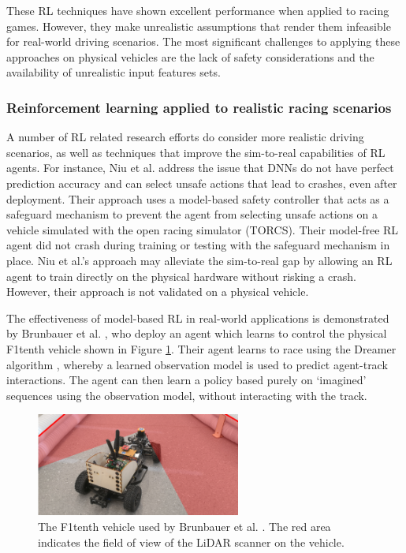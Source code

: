 These RL techniques have shown excellent performance when applied to racing games. 
However, they make unrealistic assumptions that render them infeasible for real-world driving scenarios.
The most significant challenges to applying these approaches on physical vehicles are the lack of safety considerations and the availability of unrealistic input features sets.


\subsubsection*{Reinforcement learning applied to realistic racing scenarios}

A number of RL related research efforts do consider more realistic driving scenarios, as well as techniques that improve the sim-to-real capabilities of RL agents.
For instance, Niu et al. \cite{Niu2020} address the issue that DNNs do not have perfect prediction accuracy and can select unsafe actions that lead to crashes, even after deployment.
Their approach uses a model-based safety controller that acts as a safeguard mechanism to prevent the agent from selecting unsafe actions on a vehicle simulated with the open racing simulator (TORCS).
Their model-free RL agent did not crash during training or testing with the safeguard mechanism in place.
Niu et al.'s \cite{Niu2020} approach may alleviate the sim-to-real gap by allowing an RL agent to train directly on the physical hardware without risking a crash. 
However, their approach is not validated on a physical vehicle.

The effectiveness of model-based RL in real-world applications is demonstrated by Brunbauer et al. \cite{brunnbauer2021}, who deploy an agent which learns to control the physical F1tenth vehicle shown in Figure \ref{fig:brunbauer}.
Their agent learns to race using the Dreamer algorithm \cite{Hafner2019a}, whereby a learned observation model is used to predict agent-track interactions.
The agent can then learn a policy based purely on `imagined' sequences using the observation model, without interacting with the track.

\begin{figure}[htb!]
    \centering
    \includegraphics[width=0.6\textwidth]{contents/chapt2/figs/brunnbauer.PNG}
    \caption[The F1tenth vehicle used by Brunbauer]{The F1tenth vehicle used by Brunbauer et al. \cite{brunnbauer2021}. The red area indicates the field of view of the LiDAR scanner on the vehicle.}
    \label{fig:brunbauer}
\end{figure}

